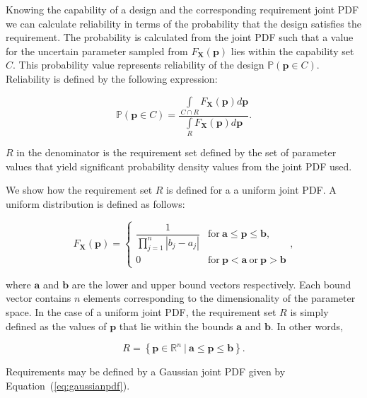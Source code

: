 Knowing the capability of a design and the corresponding requirement joint \ac{PDF} we can calculate reliability in terms of the probability that the design satisfies the requirement. The probability is calculated from the joint \ac{PDF} such that a value for the uncertain parameter sampled from $F_{\mathbf{X}}\left(\mathbf{p}\right)$ lies within the capability set $C$. This probability value represents reliability of the design $\mathbb{P}(\mathbf{p} \in C)$. Reliability is defined by the following expression:

\begin{equation} \label{eq:reliability}
	\mathbb{P}(\mathbf{p} \in C) = \dfrac{\int\limits_{C\cap R} F_{\mathbf{X}}(\mathbf{p}) d\mathbf{p}}{\int\limits_{R} F_{\mathbf{X}}(\mathbf{p}) d\mathbf{p}}.
\end{equation}

$R$ in the denominator is the requirement set defined by the set of parameter values that yield significant probability density values from the joint \ac{PDF} used. 

We show how the requirement set $R$ is defined for a a uniform joint \ac{PDF}. A uniform distribution is defined as follows:

\begin{equation} \label{eq:uniformpdf}
	F_\mathbf{X}(\mathbf{p})={\begin{cases}{\dfrac {1}{\prod\limits_{j=1}^{n} \left|b_j - a_j\right|}}&\mathrm {for} \ \mathbf{a}\leq \mathbf{p}\leq \mathbf{b},\\[8pt]0&\mathrm {for} \ \mathbf{p}<\mathbf{a}\ \mathrm {or} \ \mathbf{p}>\mathbf{b}\end{cases}},
\end{equation}

where $\mathbf{a}$ and $\mathbf{b}$ are the lower and upper bound vectors respectively. Each bound vector contains $n$ elements corresponding to the dimensionality of the parameter space. In the case of a uniform joint \ac{PDF}, the requirement set $R$ is simply defined as the values of $\mathbf{p}$ that lie within the bounds $\mathbf{a}$ and $\mathbf{b}$. In other words,

\begin{equation} \label{eq:requirementsetuniform}
	\textit{R} = \left\{\mathbf{p} \in \mathbb{R}^n~|~\mathbf{a}\leq \mathbf{p}\leq \mathbf{b}\right\}.
\end{equation}

Requirements may be defined by a Gaussian joint \ac{PDF} given by Equation~(\ref{eq:gaussianpdf}).

